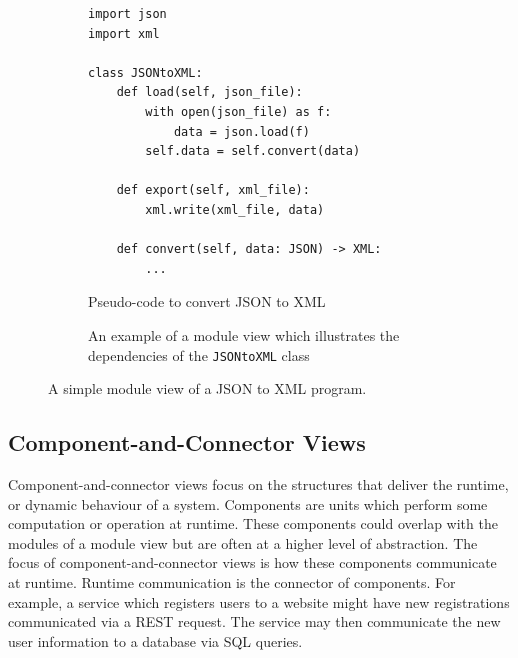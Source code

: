 \begin{figure}[ht]
\centering
\begin{subfigure}[b]{\textwidth}
\begin{shaded}
\begin{lstlisting}[style=python]
import json
import xml

class JSONtoXML:
    def load(self, json_file):
        with open(json_file) as f:
            data = json.load(f)
        self.data = self.convert(data)

    def export(self, xml_file):
        xml.write(xml_file, data)

    def convert(self, data: JSON) -> XML:
        ...
\end{lstlisting}
\end{shaded}
\vspace{-3mm}
\caption{Pseudo-code to convert JSON to XML}
\vspace{3mm}
\end{subfigure}


\begin{subfigure}[b]{\textwidth}
\begin{center}
\end{center}
\vspace{-4mm}
\caption{An example of a module view which illustrates the dependencies of the \texttt{JSONtoXML} class}
\end{subfigure}
\caption{A simple module view of a JSON to XML program.}
\end{figure}

\subsection{Component-and-Connector Views}
Component-and-connector views focus on the structures that deliver the runtime, or dynamic behaviour of a system.
Components are units which perform some computation or operation at runtime.
These components could overlap with the modules of a module view but are often at a higher level of abstraction.
The focus of component-and-connector views is how these components communicate at runtime.
Runtime communication is the connector of components.
For example, a service which registers users to a website might have new registrations communicated via a REST request.
The service may then communicate the new user information to a database via SQL queries.

